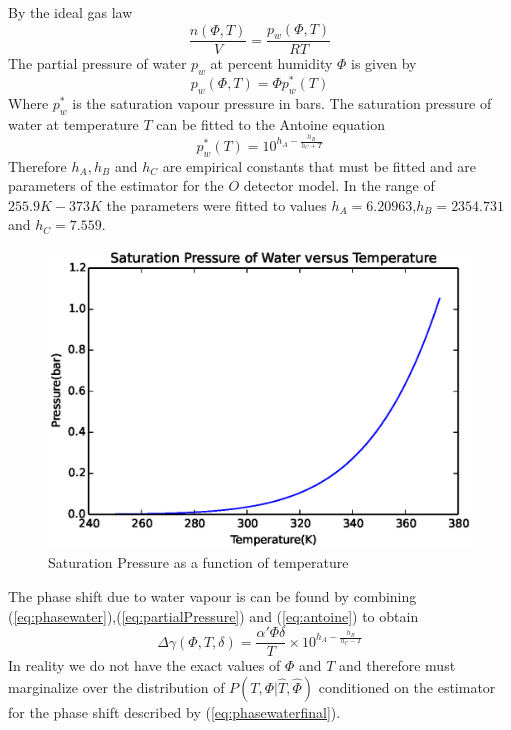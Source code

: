 By the ideal gas law 
\begin{equation}
\frac{n(\Phi,T)}{V} = \frac{p_w(\Phi,T)}{RT}
\end{equation}
The partial pressure of water $p_w$ at percent humidity $\Phi$ is given by 
\begin{equation}
p_w(\Phi,T) = \Phi p^*_w(T)
\label{eq:partialPressure}
\end{equation}
Where $p^*_w$ is the saturation vapour pressure in bars.\cite{relativehumidity} The saturation pressure of water at temperature $T$ can be fitted to the Antoine equation \cite{antoineequation}
\begin{equation}
\label{eq:antoine}
p^*_w(T) = 10^{h_A - \frac{h_B}{h_C + T}}
\end{equation} 
Therefore $h_A,h_B$ and $h_C$ are empirical constants that must be fitted and are parameters of the estimator for the $O$ detector model. In the range of $255.9K-373K$ the parameters were fitted to values $h_A=6.20963$,$h_B=2354.731$ and $h_C=7.559$.\cite{antoineequation} 
\begin{figure}[ht!]
\centering
\includegraphics[scale=1.0]{Figures/antoine.eps}
\caption{Saturation Pressure as a function of temperature}
\label{fig:antoine}
\end{figure}
The phase shift due to water vapour is can be found by combining (\ref{eq:phasewater}),(\ref{eq:partialPressure}) and (\ref{eq:antoine}) to obtain
\begin{equation}
\Delta\gamma(\Phi,T,\delta) = \frac{\alpha'\Phi\delta}{T}\times 10^{h_A - \frac{h_B}{h_C - T}}
\label{eq:phasewaterfinal}
\end{equation}
In reality we do not have the exact values of $\Phi$ and $T$ and therefore must marginalize over the distribution of $P(T,\Phi|\hat{T},\hat{\Phi})$ conditioned on the estimator for the phase shift described by (\ref{eq:phasewaterfinal}).
